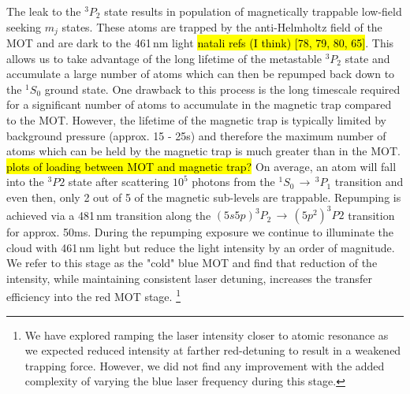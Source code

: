 The leak to the $^3P_2$ state results in population of magnetically trappable low-field seeking $m_j$ states. 
These atoms are trapped by the anti-Helmholtz field of the MOT and are dark to the 461\,nm light \hl{natali refs (I think) [78, 79, 80, 65]}.
This allows us to take advantage of the long lifetime of the metastable $^3P_2$ state and accumulate a large number of atoms which can then be repumped back down to the $^1S_0$ ground state.
One drawback to this process is the long timescale required for a significant number of atoms to accumulate in the magnetic trap compared to the MOT.
However, the lifetime of the magnetic trap is typically limited by background pressure (approx. 15 - 25s) and therefore the maximum number of atoms which can be held by the magnetic trap is much greater than in the MOT. \hl{plots of loading between MOT and magnetic trap?}
On average, an atom will fall into the $^3P2$ state after scattering $10^5$ photons from the $^1S_0\,\rightarrow\,^3P_1$ transition and even then, only 2 out of 5 of the magnetic sub-levels are trappable.
Repumping is achieved via a 481\,nm transition along the $(5s5p)^3P_2\,\rightarrow\,(5p^2)^3P2$ transition for approx. 50ms.
During the repumping exposure we continue to illuminate the cloud with 461\,nm light but reduce the light intensity by an order of magnitude.
We refer to this stage as the "cold" blue MOT and find that reduction of the intensity, while maintaining consistent laser detuning, increases the transfer efficiency into the red MOT stage.
\footnote{We have explored ramping the laser intensity closer to atomic resonance as we expected reduced intensity at farther red-detuning to result in a weakened trapping force.
However, we did not find any improvement with the added complexity of varying the blue laser frequency during this stage.}


